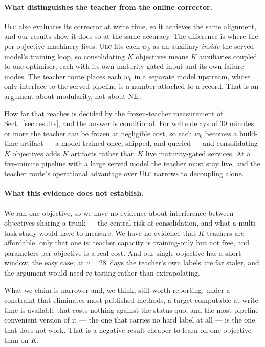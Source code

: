 \paragraph{What distinguishes the teacher from the online corrector.}
\textsc{Ulc} also evaluates its corrector at write time, so it achieves the same alignment, and
our results show it does so at the same accuracy. The difference is where the per-objective
machinery lives. \textsc{Ulc} fits each $w_k$ as an auxiliary \emph{inside} the served model's
training loop, so consolidating $K$ objectives means $K$ auxiliaries coupled to one optimiser,
each with its own maturity-gated input and its own failure modes. The teacher route places each
$w_k$ in a separate model upstream, whose only interface to the served pipeline is a number
attached to a record. That is an argument about modularity, not about $\mathrm{NE}$.

How far that reaches is decided by the frozen-teacher measurement of
Sect.~\ref{sec:results}, and the answer is conditional. For write delays of 30 minutes or more
the teacher can be frozen at negligible cost, so each $w_k$ becomes a build-time artifact --- a
model trained once, shipped, and queried --- and consolidating $K$ objectives adds $K$
artifacts rather than $K$ live maturity-gated services. At a five-minute pipeline with a large
served model the teacher must stay live, and the teacher route's operational advantage over
\textsc{Ulc} narrows to decoupling alone.

\paragraph{What this evidence does not establish.}
We ran one objective, so we have no evidence about interference between objectives sharing a
trunk --- the central risk of consolidation, and what a multi-task study would have to measure.
We have no evidence that $K$ teachers are affordable, only that one is: teacher capacity is
training-only but not free, and \teacherParams{} parameters per objective is a real cost. And
our single objective has a short window, the easy case; at $v=28$~days the teacher's own labels
are far staler, and the argument would need re-testing rather than extrapolating.

What we claim is narrower and, we think, still worth reporting: under a constraint that
eliminates most published methods, a target computable at write time is available that costs
nothing against the status quo, and the most pipeline-convenient version of it --- the one that
carries no hard label at all --- is the one that does not work. That is a negative result
cheaper to learn on one objective than on $K$.
